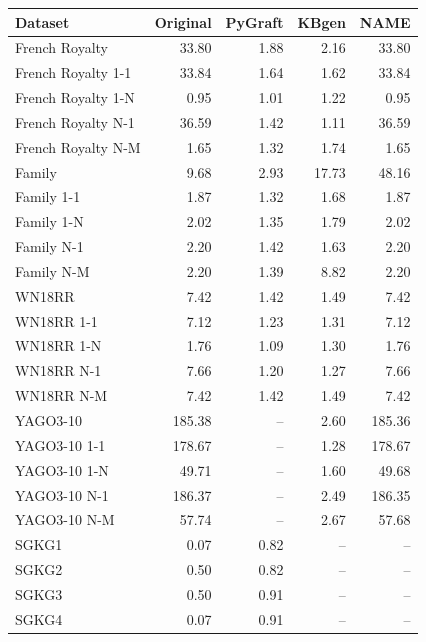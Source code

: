 \begin{tabular}{lrrrr}
\toprule
Dataset & Original & PyGraft & KBgen & NAME \\
\midrule
French Royalty & 33.80 & 1.88 & 2.16 & 33.80 \\
French Royalty 1-1 & 33.84 & 1.64 & 1.62 & 33.84 \\
French Royalty 1-N & 0.95 & 1.01 & 1.22 & 0.95 \\
French Royalty N-1 & 36.59 & 1.42 & 1.11 & 36.59 \\
French Royalty N-M & 1.65 & 1.32 & 1.74 & 1.65 \\
\midrule
Family & 9.68 & 2.93 & 17.73 & 48.16 \\
Family 1-1 & 1.87 & 1.32 & 1.68 & 1.87 \\
Family 1-N & 2.02 & 1.35 & 1.79 & 2.02 \\
Family N-1 & 2.20 & 1.42 & 1.63 & 2.20 \\
Family N-M & 2.20 & 1.39 & 8.82 & 2.20 \\
\midrule
WN18RR & 7.42 & 1.42 & 1.49 & 7.42 \\
WN18RR 1-1 & 7.12 & 1.23 & 1.31 & 7.12 \\
WN18RR 1-N & 1.76 & 1.09 & 1.30 & 1.76 \\
WN18RR N-1 & 7.66 & 1.20 & 1.27 & 7.66 \\
WN18RR N-M & 7.42 & 1.42 & 1.49 & 7.42 \\
\midrule
YAGO3-10 & 185.38 & – & 2.60 & 185.36 \\
YAGO3-10 1-1 & 178.67 & – & 1.28 & 178.67 \\
YAGO3-10 1-N & 49.71 & – & 1.60 & 49.68 \\
YAGO3-10 N-1 & 186.37 & – & 2.49 & 186.35 \\
YAGO3-10 N-M & 57.74 & – & 2.67 & 57.68 \\
\midrule
SGKG1 & 0.07 & 0.82 & – & – \\
SGKG2 & 0.50 & 0.82 & – & – \\
SGKG3 & 0.50 & 0.91 & – & – \\
SGKG4 & 0.07 & 0.91 & – & – \\
\bottomrule
\end{tabular}
